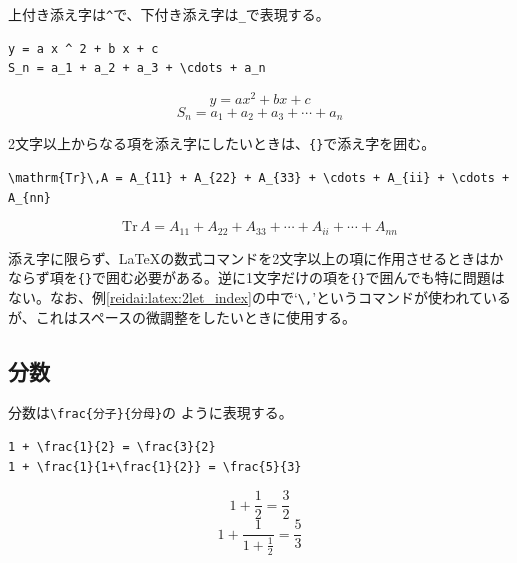 上付き添え字は\texttt{\^}で、下付き添え字は\texttt{\_}で表現する。
\begin{reidai}
    \begin{verbatim}
y = a x ^ 2 + b x + c
S_n = a_1 + a_2 + a_3 + \cdots + a_n
\end{verbatim}
\end{reidai}
\vspace*{-1.5em}
\begin{kekka}
    \begin{equation*}
        y = a x ^ 2 + b x + c
    \end{equation*}
    \begin{equation*}
        S_n = a_1 + a_2 + a_3 + \cdots + a_n
    \end{equation*}
    \vspace{0pt}
\end{kekka} \noindent
2文字以上からなる項を添え字にしたいときは、\verb|{}|で添え字を囲む。
\begin{reidai}
    \label{reidai:latex:2let_index}
    \begin{verbatim}
\mathrm{Tr}\,A = A_{11} + A_{22} + A_{33} + \cdots + A_{ii} + \cdots + A_{nn}
\end{verbatim}
\end{reidai}
\vspace*{-1.5em}
\begin{kekka}
    \begin{equation*}
        \mathrm{Tr}\,A = A_{11} + A_{22} + A_{33} + \cdots + A_{ii} + \cdots + A_{nn}
    \end{equation*}
    \vspace{0pt}
\end{kekka} \noindent
添え字に限らず、\LaTeX の数式コマンドを2文字以上の項に作用させるときはかならず項を\verb|{}|で囲む必要がある。逆に1文字だけの項を\verb|{}|で囲んでも特に問題はない。なお、例\ref{reidai:latex:2let_index}の中で`\verb|\,|'というコマンドが使われているが、これはスペースの微調整をしたいときに使用する。

\subsection{分数}
\label{sec:latex:frac}

分数は\texttt{\textbackslash frac\{\textrm{分子}\}\{\textrm{分母}\}}の
ように表現する。
\begin{reidai}
    \begin{verbatim}
1 + \frac{1}{2} = \frac{3}{2}
1 + \frac{1}{1+\frac{1}{2}} = \frac{5}{3}
\end{verbatim}
\end{reidai}
\vspace*{-1.5em}
\begin{kekka}
    \begin{equation*}
        1 + \frac{1}{2} = \frac{3}{2}
    \end{equation*}
    \begin{equation*}
        1 + \frac{1}{1+\frac{1}{2}} = \frac{5}{3}
    \end{equation*}
\end{kekka}


